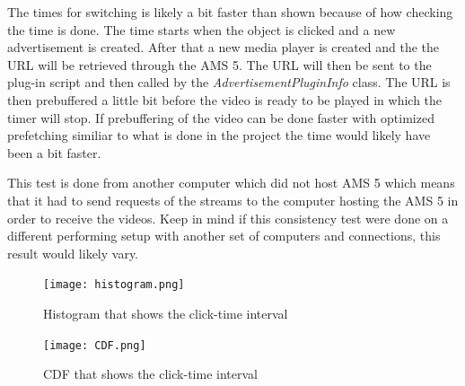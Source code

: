 The times for switching is likely a bit faster than shown because of how checking the time is done. The time starts when the object is clicked and a new advertisement is created. After that a new media player is created and the the URL will be retrieved through the AMS 5. The URL will then be sent to the plug-in script and then called by the \textit{AdvertisementPluginInfo} class. The URL is then prebuffered a little bit before the video is ready to be played in which the timer will stop. If prebuffering of the video can be done faster with optimized prefetching similiar to what is done in the project \cite{optimizedstreaming} the time would likely have been a bit faster.

This test is done from another computer which did not host AMS 5 which means that it had to send requests of the streams to the computer hosting the AMS 5 in order to receive the videos. Keep in mind if this consistency test were done on a different performing setup with another set of computers and connections, this result would likely vary.

\newpage

\begin{figure}[ht!]
\begin{center}
	\texttt{[image: histogram.png]}
	\caption{Histogram that shows the click-time interval}
	\label{fig:histogram}
\end{center}
\end{figure}

\begin{figure}[ht!]
\begin{center}
	\texttt{[image: CDF.png]}
	\caption{CDF that shows the click-time interval}
	\label{fig:cdf}
\end{center}
\end{figure}
